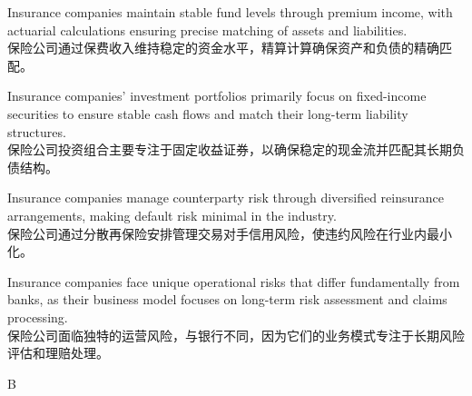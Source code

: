 \documentclass{article}
\begin{document}
\begin{choices}
    \item Insurance companies maintain stable fund levels through premium income, with actuarial calculations ensuring precise matching of assets and liabilities.\\保险公司通过保费收入维持稳定的资金水平，精算计算确保资产和负债的精确匹配。
    \item Insurance companies' investment portfolios primarily focus on fixed-income securities to ensure stable cash flows and match their long-term liability structures.\\保险公司投资组合主要专注于固定收益证券，以确保稳定的现金流并匹配其长期负债结构。
    \item Insurance companies manage counterparty risk through diversified reinsurance arrangements, making default risk minimal in the industry.\\保险公司通过分散再保险安排管理交易对手信用风险，使违约风险在行业内最小化。
    \item Insurance companies face unique operational risks that differ fundamentally from banks, as their business model focuses on long-term risk assessment and claims processing.\\保险公司面临独特的运营风险，与银行不同，因为它们的业务模式专注于长期风险评估和理赔处理。
\end{choices}

\begin{correctanswer}
    B
\end{correctanswer}
\end{document}
